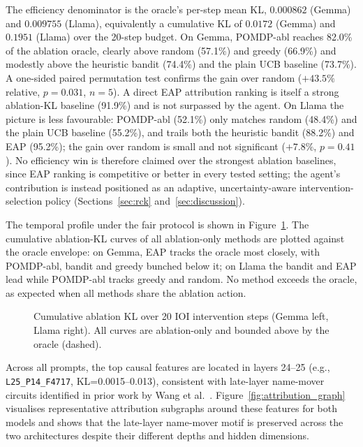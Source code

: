 The efficiency denominator is the oracle's per-step mean KL, $0.000862$
(Gemma) and $0.009755$ (Llama), equivalently a cumulative KL of $0.0172$
(Gemma) and $0.1951$ (Llama) over the 20-step budget.
On Gemma, POMDP-abl reaches 82.0\% of the ablation oracle, clearly
above random (57.1\%) and greedy (66.9\%) and modestly above the
heuristic bandit (74.4\%) and the plain UCB baseline (73.7\%).  A
one-sided paired permutation test confirms the
gain over random ($+43.5\%$ relative, $p=0.031$, $n=5$).  A
direct EAP attribution ranking is itself a strong ablation-KL baseline
(91.9\%) and is not surpassed by the agent.  On Llama the
picture is less favourable: POMDP-abl (52.1\%) only matches random
(48.4\%) and the plain UCB baseline (55.2\%), and trails both the
heuristic bandit (88.2\%) and EAP (95.2\%); the
gain over random is small and not significant ($+7.8\%$, $p=0.41$).
No efficiency win is therefore claimed over the strongest
ablation baselines, since EAP ranking is competitive or better in every
tested setting; the agent's contribution is instead positioned as
an adaptive, uncertainty-aware intervention-selection policy
(Sections~\ref{sec:rck} and~\ref{sec:discussion}).

The temporal profile under the fair protocol is shown in
Figure~\ref{fig:cumkl}.  The cumulative ablation-KL curves of all
ablation-only methods are plotted against the oracle envelope: on
Gemma, EAP tracks the oracle most closely, with POMDP-abl, bandit and
greedy bunched below it; on Llama the bandit and EAP lead while
POMDP-abl tracks greedy and random.  No method exceeds the oracle, as
expected when all methods share the ablation action.

\begin{figure}[H]
\centering

\caption{Cumulative ablation KL over 20 IOI intervention steps
(Gemma left, Llama right). All curves are ablation-only and bounded
above by the oracle (dashed).}
\label{fig:cumkl}
\end{figure}

Across all prompts, the top causal features are located in layers
24--25 (e.g., \texttt{L25\_P14\_F4717}, KL=0.0015--0.013),
consistent with late-layer name-mover circuits identified in prior
work by Wang et al.~\cite{Wang2022}.  Figure~\ref{fig:attribution_graph}
visualises representative attribution subgraphs around these features
for both models and shows that the late-layer name-mover motif is
preserved across the two architectures despite their different depths
and hidden dimensions.

